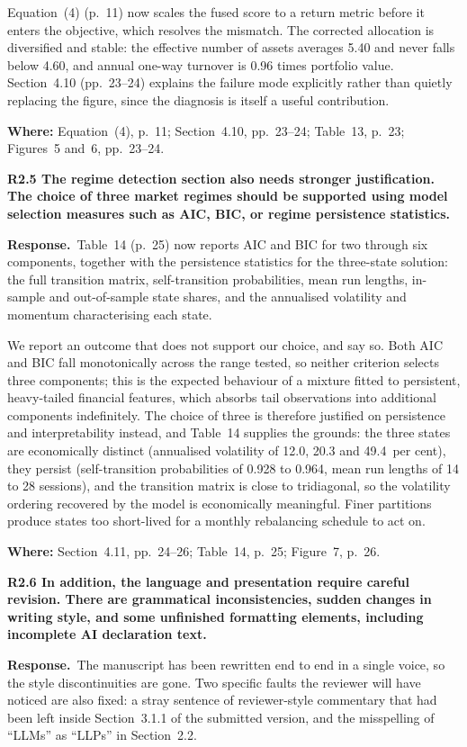 \documentclass[11pt,a4paper]{article}
\newcommand{\rc}[1]{\par\medskip\noindent\textbf{#1}\par\nopagebreak}
\newcommand{\resp}{\par\noindent\textbf{Response.}\ }
\newcommand{\where}[1]{\par\smallskip\noindent\textcolor{blue!55!black}{\textbf{Where:} #1}\par}
\begin{document}
Equation~(4) (p.~11) now scales the fused score to a return metric before it enters the
objective, which resolves the mismatch. The corrected allocation is diversified and
stable: the effective number of assets averages 5.40 and never falls below 4.60, and
annual one-way turnover is 0.96 times portfolio value. Section~4.10 (pp.~23--24) explains
the failure mode explicitly rather than quietly replacing the figure, since the
diagnosis is itself a useful contribution.
\where{Equation~(4), p.~11; Section~4.10, pp.~23--24; Table~13, p.~23; Figures~5
and~6, pp.~23--24.}

\rc{R2.5 The regime detection section also needs stronger justification. The choice of
three market regimes should be supported using model selection measures such as AIC,
BIC, or regime persistence statistics.}

\resp Table~14 (p.~25) now reports AIC and BIC for two through six components, together
with the persistence statistics for the three-state solution: the full transition
matrix, self-transition probabilities, mean run lengths, in-sample and out-of-sample
state shares, and the annualised volatility and momentum characterising each state.

We report an outcome that does not support our choice, and say so. Both AIC and BIC fall
monotonically across the range tested, so neither criterion selects three components;
this is the expected behaviour of a mixture fitted to persistent, heavy-tailed financial
features, which absorbs tail observations into additional components indefinitely. The
choice of three is therefore justified on persistence and interpretability instead, and
Table~14 supplies the grounds: the three states are economically distinct (annualised
volatility of 12.0, 20.3 and 49.4~per cent), they persist (self-transition probabilities
of 0.928 to 0.964, mean run lengths of 14 to 28 sessions), and the transition matrix is
close to tridiagonal, so the volatility ordering recovered by the model is economically
meaningful. Finer partitions produce states too short-lived for a monthly rebalancing
schedule to act on.
\where{Section~4.11, pp.~24--26; Table~14, p.~25; Figure~7, p.~26.}

\rc{R2.6 In addition, the language and presentation require careful revision. There are
grammatical inconsistencies, sudden changes in writing style, and some unfinished
formatting elements, including incomplete AI declaration text.}

\resp The manuscript has been rewritten end to end in a single voice, so the style
discontinuities are gone. Two specific faults the reviewer will have noticed are also
fixed: a stray sentence of reviewer-style commentary that had been left inside
Section~3.1.1 of the submitted version, and the misspelling of ``LLMs'' as ``LLPs'' in
Section~2.2.
\end{document}
